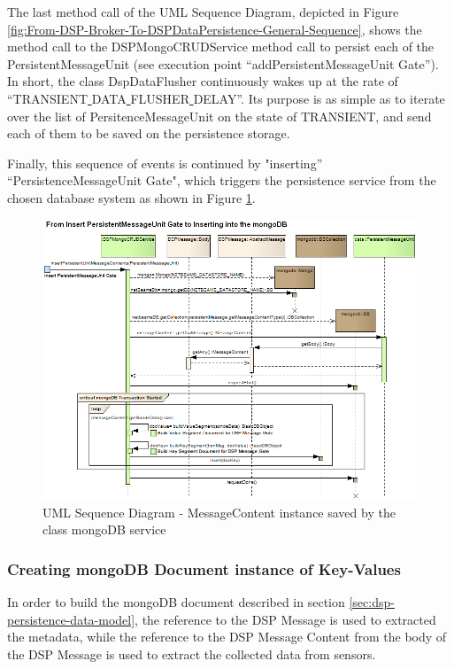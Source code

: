 The last method call of the UML Sequence Diagram, depicted in Figure
\ref{fig:From-DSP-Broker-To-DSPDataPersistence-General-Sequence}, shows the
method call to the DSPMongoCRUDService method call to persist each of the
PersistentMessageUnit (see execution point ``addPersistentMessageUnit Gate'').
In short, the class DspDataFlusher continuously wakes up at the rate of
``TRANSIENT\underline{ }DATA\underline{ }FLUSHER\underline{ }DELAY''. Its
purpose is as simple as to iterate over the list of PersitenceMessageUnit on
the state of TRANSIENT, and send each of them to be saved on the persistence
storage. 

Finally, this sequence of events is continued by "inserting''
``PersistenceMessageUnit Gate", which triggers the persistence service from the
chosen database system as shown in Figure
\ref{fig:From-Insert-PersistentMessageUnit-to-mongoDB}.

\begin{figure}[!h]
  \centering
  \includegraphics[scale=0.6]{../diagrams/From-Insert-PersistentMessageUnit-to-mongoDB} 
  \caption{UML Sequence Diagram - MessageContent instance saved by the class
  mongoDB service}
  \label{fig:From-Insert-PersistentMessageUnit-to-mongoDB}
\end{figure}

\subsubsection{Creating mongoDB Document instance of Key-Values}

In order to build the mongoDB document described in section
\ref{sec:dsp-persistence-data-model}, the reference to the DSP Message is
used to extracted the metadata, while the reference to the DSP Message Content 
from the body of the DSP Message is used to extract the collected data from
sensors.

